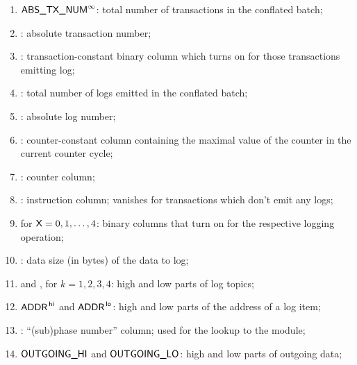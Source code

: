 \begin{enumerate}
	\item $\textsf{ABS\_TX\_NUM}^\infty$: total number of transactions in the conflated batch;
	\item \absTxNum{}: absolute transaction number;
	\item \txEmitsLogs{}: transaction-constant binary column which turns on for those transactions emitting log; 
	\item \absLogNumMax{}: total number of logs emitted in the conflated batch;
	\item \absLogNum{}: absolute log number;
	\item \maxCt{}: counter-constant column containing the maximal value of the counter in the current counter cycle;
	\item \ct{}: counter column;
	\item \INST: instruction column; vanishes for transactions which don't emit any logs;
	\item {} for $\textsf{X} = 0, 1, \dots, 4$: binary columns that turn on for the respective logging operation; 
	\item \logDataSize{}: data size (in bytes) of the data to log;
	\item {} and , for $k = 1, 2, 3, 4$: high and low parts of log topics; 
	\item $\textsf{ADDR}^{\mathsf{\,hi}}$ and $\textsf{ADDR}^{\mathsf{\,lo}}$: high and low parts of the address of a log item;
	\item \phaseNum{}: ``(sub)phase number'' column; used for the lookup to the \rlpTxnRcptMod{} module; 
	\item $\textsf{OUTGOING}\textsf{\_HI}{}$ and $\textsf{OUTGOING}\textsf{\_LO}{}$: high and low parts of outgoing data;
\end{enumerate}
